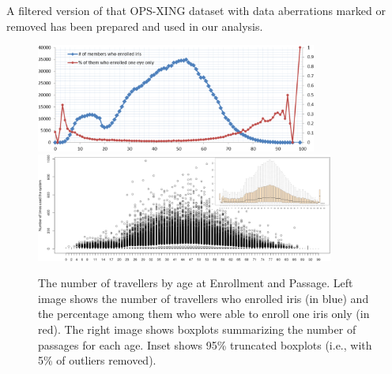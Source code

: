 \documentclass{cta-author}%
\begin{document}


A  filtered  version of that OPS-XING  dataset with
data aberrations marked or removed has been prepared and used in our analysis.






\begin{figure}[!t]
\includegraphics[width=0.45\linewidth,height=1.4in]{eps/age-one-eye.eps}\quad 
\includegraphics[width=0.55\linewidth,height=1.4in]{eps/USED-wInset-0.eps} 

\caption{
The number of travellers by age at Enrollment and Passage. 
Left image shows the number of travellers who enrolled iris (in blue) and the percentage among them who were able to enroll one iris  only (in red). 
The right image shows  boxplots summarizing the number of passages for each age. Inset shows 95\% truncated boxplots (i.e., with 5\% of outliers removed). 
}
\label{fBoxplot-IQen}
\end{figure}
\end{document}
